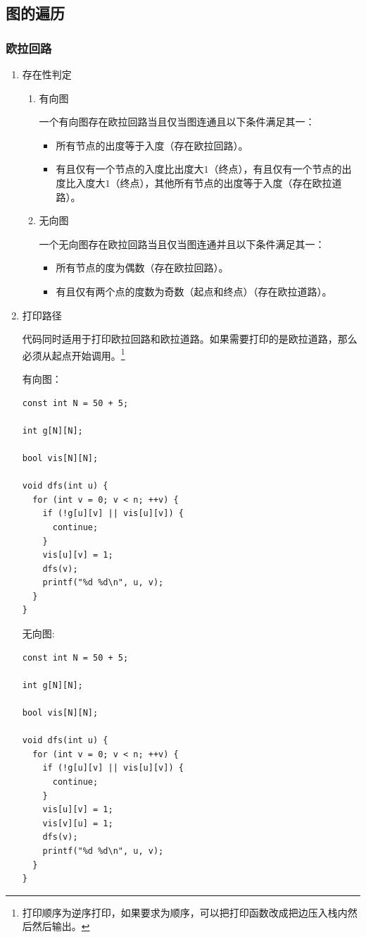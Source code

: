 \documentclass[11pt]{article}
\begin{document}
\subsection{图的遍历}
\label{sec-2-5}
\subsubsection{欧拉回路}
\label{sec-2-5-1}
\begin{enumerate}
\item 存在性判定
\label{sec-2-5-1-1}
\begin{enumerate}
\item 有向图
\label{sec-2-5-1-1-1}

一个有向图存在欧拉回路当且仅当图连通且以下条件满足其一：

\begin{itemize}
\item 所有节点的出度等于入度（存在欧拉回路）。
\item 有且仅有一个节点的入度比出度大\(1\)（终点），有且仅有一个节点的出度比入度大\(1\)（终点），其他所有节点的出度等于入度（存在欧拉道路）。
\end{itemize}

\item 无向图
\label{sec-2-5-1-1-2}

一个无向图存在欧拉回路当且仅当图连通并且以下条件满足其一：

\begin{itemize}
\item 所有节点的度为偶数（存在欧拉回路）。
\item 有且仅有两个点的度数为奇数（起点和终点）（存在欧拉道路）。
\end{itemize}
\end{enumerate}
\item 打印路径
\label{sec-2-5-1-2}

代码同时适用于打印欧拉回路和欧拉道路。如果需要打印的是欧拉道路，那么必须从起点开始调用。\footnote{打印顺序为逆序打印，如果要求为顺序，可以把打印函数改成把边压入栈内然后然后输出。}

有向图：

\begin{verbatim}
const int N = 50 + 5;

int g[N][N];

bool vis[N][N];

void dfs(int u) {
  for (int v = 0; v < n; ++v) {
    if (!g[u][v] || vis[u][v]) {
      continue;
    }
    vis[u][v] = 1;
    dfs(v);
    printf("%d %d\n", u, v);
  }
}
\end{verbatim}

无向图:

\begin{verbatim}
const int N = 50 + 5;

int g[N][N];

bool vis[N][N];

void dfs(int u) {
  for (int v = 0; v < n; ++v) {
    if (!g[u][v] || vis[u][v]) {
      continue;
    }
    vis[u][v] = 1;
    vis[v][u] = 1;
    dfs(v);
    printf("%d %d\n", u, v);
  }
}
\end{verbatim}
\end{enumerate}
\end{document}
